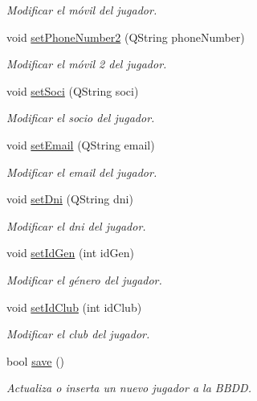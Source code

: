 \begin{DoxyCompactItemize}
\begin{DoxyCompactList}\small\item\em Modificar el móvil del jugador. \end{DoxyCompactList}\item 
void \mbox{\hyperlink{classjugador_a7541a8d0d7df4c5cc1fc49b15cd24da3}{set\+Phone\+Number2}} (Q\+String phone\+Number)
\begin{DoxyCompactList}\small\item\em Modificar el móvil 2 del jugador. \end{DoxyCompactList}\item 
void \mbox{\hyperlink{classjugador_a684e5c98a3c39214b93923615d1a2fb2}{set\+Soci}} (Q\+String soci)
\begin{DoxyCompactList}\small\item\em Modificar el socio del jugador. \end{DoxyCompactList}\item 
void \mbox{\hyperlink{classjugador_a75f1d73c24c859503450958bbf1d48ea}{set\+Email}} (Q\+String email)
\begin{DoxyCompactList}\small\item\em Modificar el email del jugador. \end{DoxyCompactList}\item 
void \mbox{\hyperlink{classjugador_a442a923a8704d783a9b0b7ce917a7e39}{set\+Dni}} (Q\+String dni)
\begin{DoxyCompactList}\small\item\em Modificar el dni del jugador. \end{DoxyCompactList}\item 
void \mbox{\hyperlink{classjugador_aa0fd016230cc38f0ac2e7cd6c90003d3}{set\+Id\+Gen}} (int id\+Gen)
\begin{DoxyCompactList}\small\item\em Modificar el género del jugador. \end{DoxyCompactList}\item 
void \mbox{\hyperlink{classjugador_ac869d669d44efd142595e087cbb2b3f3}{set\+Id\+Club}} (int id\+Club)
\begin{DoxyCompactList}\small\item\em Modificar el club del jugador. \end{DoxyCompactList}\item 
bool \mbox{\hyperlink{classjugador_af56aa410ca759cb4e3548af92de007b0}{save}} ()
\begin{DoxyCompactList}\small\item\em Actualiza o inserta un nuevo jugador a la B\+B\+DD. \end{DoxyCompactList}\item 

\end{DoxyCompactItemize}
